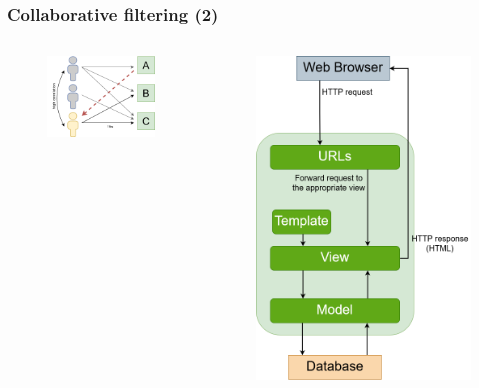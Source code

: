\begin{frame}
    \frametitle{Collaborative filtering (2)}
    \begin{columns}
        \begin{column}{0.5\textwidth}
            \begin{figure}
                \centering
                \includegraphics[scale=0.5]{images/UB_CF_ex}
            \end{figure}
        \end{column}
        \begin{column}{0.5\textwidth}
            \begin{figure}
                \centering
                \includegraphics[scale=0.5]{images/IB_CF_ex}

\end{figure}
\end{column}
\end{columns}
\end{frame}
